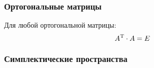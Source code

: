 \subsubsection{\xmark Ортогональные матрицы}

\noindent
Для любой ортогональной матрицы:
\begin{equation}
    A^{\text{T}} \cdot A = E
\end{equation} 

\subsubsection{\xmark Симплектические пространства}




